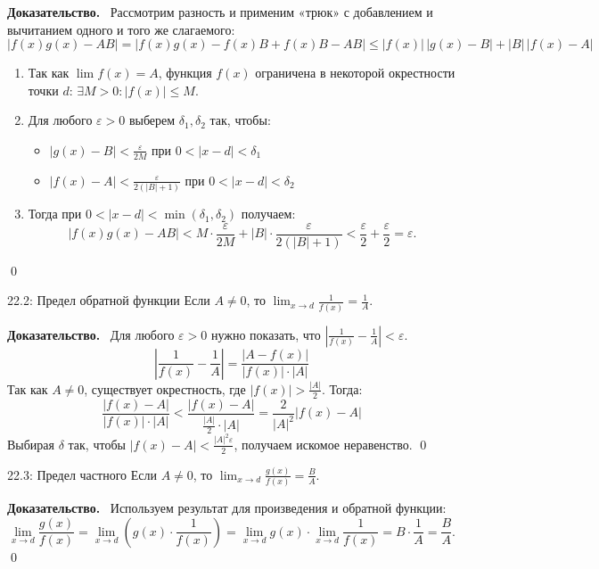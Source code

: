 \documentclass[a4paper,12pt]{article}
\newcommand{\myproof}{\textbf{Доказательство.}\ }
\begin{document}
	\vspace{0.5cm}
	\myproof
	Рассмотрим разность и применим «трюк» с добавлением и вычитанием одного и того же слагаемого:
	\[ |f(x)g(x) - AB| = |f(x)g(x) - f(x)B + f(x)B - AB| \le |f(x)|\,|g(x) - B| + |B|\,|f(x) - A| \]
	\begin{enumerate}
		\item Так как $\lim f(x) = A$, функция $f(x)$ ограничена в некоторой окрестности точки $d$: $\exists M > 0 \colon |f(x)| \le M$.
		\item Для любого $\varepsilon > 0$ выберем $\delta_1, \delta_2$ так, чтобы:
		\begin{itemize}
			\item $|g(x) - B| < \frac{\varepsilon}{2M}$ при $0 < |x - d| < \delta_1$
			\item $|f(x) - A| < \frac{\varepsilon}{2(|B|+1)}$ при $0 < |x - d| < \delta_2$
		\end{itemize}
		\item Тогда при $0 < |x - d| < \min(\delta_1, \delta_2)$ получаем:
		\[ |f(x)g(x) - AB| < M \cdot \frac{\varepsilon}{2M} + |B| \cdot \frac{\varepsilon}{2(|B|+1)} < \frac{\varepsilon}{2} + \frac{\varepsilon}{2} = \varepsilon. \]
	\end{enumerate} \qed
	
	\begin{theorembox}{22.2: Предел обратной функции}
		Если $A \neq 0$, то $\lim_{x \to d} \frac{1}{f(x)} = \frac{1}{A}$.
	\end{theorembox}
	
	\myproof
	Для любого $\varepsilon > 0$ нужно показать, что $\left| \frac{1}{f(x)} - \frac{1}{A} \right| < \varepsilon$.
	\[ \left| \frac{1}{f(x)} - \frac{1}{A} \right| = \frac{|A - f(x)|}{|f(x)| \cdot |A|} \]
	Так как $A \neq 0$, существует окрестность, где $|f(x)| > \frac{|A|}{2}$. Тогда:
	\[ \frac{|f(x) - A|}{|f(x)| \cdot |A|} < \frac{|f(x) - A|}{\frac{|A|}{2} \cdot |A|} = \frac{2}{|A|^2} |f(x) - A| \]
	Выбирая $\delta$ так, чтобы $|f(x) - A| < \frac{|A|^2 \varepsilon}{2}$, получаем искомое неравенство. \qed
	
	\vspace{0.5cm}
	\begin{theorembox}{22.3: Предел частного}
		Если $A \neq 0$, то $\lim_{x \to d} \frac{g(x)}{f(x)} = \frac{B}{A}$.
	\end{theorembox}
	
	\vspace{0.5cm}
	\myproof
	Используем результат для произведения и обратной функции:
	\[ \lim_{x \to d} \frac{g(x)}{f(x)} = \lim_{x \to d} \left( g(x) \cdot \frac{1}{f(x)} \right) = \lim_{x \to d} g(x) \cdot \lim_{x \to d} \frac{1}{f(x)} = B \cdot \frac{1}{A} = \frac{B}{A}. \] \qed
	
\end{document}
